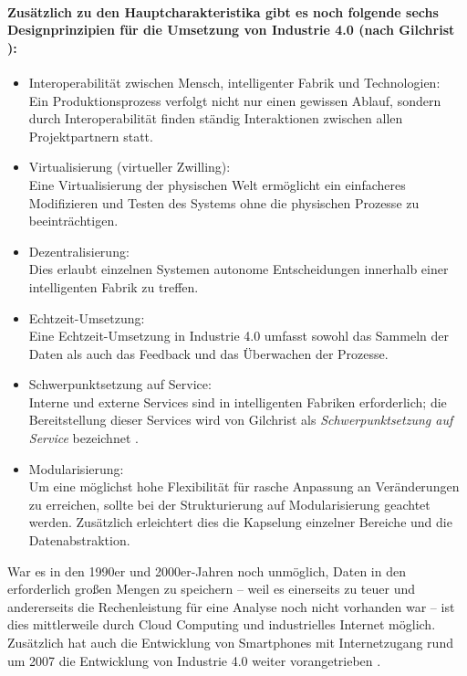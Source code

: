 \paragraph{Zusätzlich zu den Hauptcharakteristika gibt es noch folgende sechs Designprinzipien für die Umsetzung von Industrie 4.0 (nach Gilchrist \parencite{gilchrist2016industry}):}
\begin{itemize}
\item Interoperabilität zwischen Mensch, intelligenter Fabrik und Technologien:\\
Ein Produktionsprozess verfolgt nicht nur einen gewissen Ablauf, sondern durch Interoperabilität finden ständig Interaktionen zwischen allen Projektpartnern statt. 
\item Virtualisierung (virtueller Zwilling):\\
Eine Virtualisierung der physischen Welt ermöglicht ein einfacheres Modifizieren und Testen des Systems ohne die physischen Prozesse zu beeinträchtigen.
\item Dezentralisierung:\\
Dies erlaubt einzelnen Systemen autonome Entscheidungen innerhalb einer intelligenten Fabrik zu treffen.
\item Echtzeit-Umsetzung:\\
Eine Echtzeit-Umsetzung in Industrie 4.0 umfasst sowohl das Sammeln der Daten als auch das Feedback und das Überwachen der Prozesse.
\item Schwerpunktsetzung auf Service:\\
Interne und externe Services sind in intelligenten Fabriken erforderlich; die Bereitstellung dieser Services wird von Gilchrist als \textit {Schwerpunktsetzung auf Service} bezeichnet \parencite{gilchrist2016industry}.
\item Modularisierung:\\
Um eine möglichst hohe Flexibilität für rasche Anpassung an Veränderungen zu erreichen, sollte bei der Strukturierung auf Modularisierung geachtet werden. Zusätzlich erleichtert dies die Kapselung einzelner Bereiche und die Datenabstraktion.
\end{itemize}
\vspace{\baselineskip}
War es in den 1990er und 2000er-Jahren noch unmöglich, Daten in den erforderlich großen Mengen zu speichern -- weil es einerseits zu teuer und andererseits die Rechenleistung für eine Analyse noch nicht vorhanden war -- ist dies mittlerweile durch Cloud Computing und industrielles Internet möglich. Zusätzlich hat auch die Entwicklung von Smartphones mit Internetzugang rund um 2007 die Entwicklung von Industrie 4.0 weiter vorangetrieben \parencite{gilchrist2016industry}.

